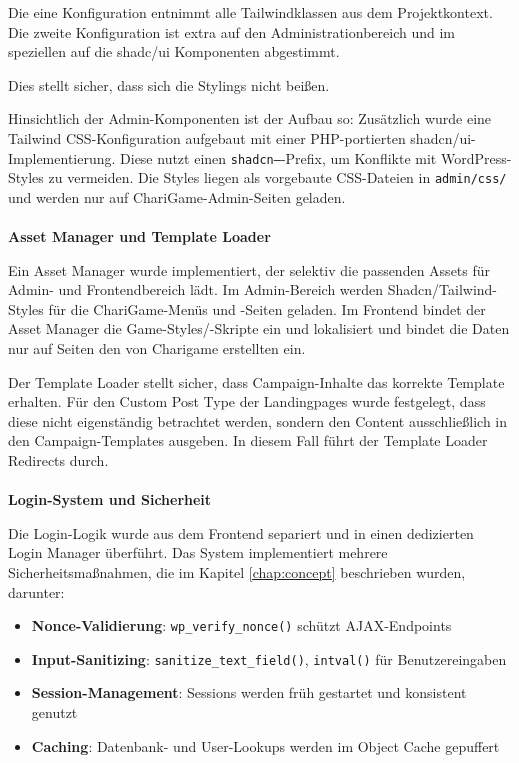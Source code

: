 Die eine Konfiguration entnimmt alle Tailwindklassen aus dem Projektkontext.
Die zweite Konfiguration ist extra auf den Administrationbereich und im speziellen auf die shadc/ui Komponenten abgestimmt.

Dies stellt sicher, dass sich die Stylings nicht beißen.

Hinsichtlich der Admin-Komponenten ist der Aufbau so:
Zusätzlich wurde eine Tailwind CSS-Konfiguration aufgebaut mit einer PHP-portierten shadcn/ui-Implementierung.
Diese nutzt einen \texttt{shadcn--}-Prefix, um Konflikte mit WordPress-Styles zu vermeiden.
Die Styles liegen als vorgebaute CSS-Dateien in \texttt{admin/css/} und werden nur auf ChariGame-Admin-Seiten geladen.
\\\\
\textbf{Asset Manager und Template Loader}

Ein Asset Manager wurde implementiert, der selektiv die passenden Assets für Admin- und Frontendbereich lädt.
Im Admin-Bereich werden Shadcn/Tailwind-Styles für die ChariGame-Menüs und -Seiten geladen.
Im Frontend bindet der Asset Manager die Game-Styles/-Skripte ein und lokalisiert und bindet die Daten nur auf Seiten den von Charigame erstellten ein.

Der Template Loader stellt sicher, dass Campaign-Inhalte das korrekte Template erhalten.
Für den Custom Post Type der Landingpages wurde festgelegt, dass diese nicht eigenständig betrachtet werden, sondern den Content ausschließlich in den Campaign-Templates ausgeben.
In diesem Fall führt der Template Loader Redirects durch.
\\\\
\textbf{Login-System und Sicherheit}

Die Login-Logik wurde aus dem Frontend separiert und in einen dedizierten Login Manager überführt.
Das System implementiert mehrere Sicherheitsmaßnahmen, die im Kapitel \ref{chap:concept} beschrieben wurden, darunter:

\begin{itemize}
    \item \textbf{Nonce-Validierung}: \texttt{wp\_verify\_nonce()} schützt AJAX-Endpoints
    \item \textbf{Input-Sanitizing}: \texttt{sanitize\_text\_field()}, \texttt{intval()} für Benutzereingaben
    \item \textbf{Session-Management}: Sessions werden früh gestartet und konsistent genutzt
    \item \textbf{Caching}: Datenbank- und User-Lookups werden im Object Cache gepuffert
\end{itemize}

